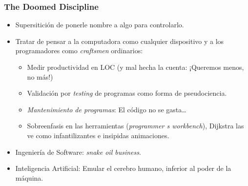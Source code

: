 \documentclass[ignorenonframetext,]{beamer}
\begin{document}
\begin{frame}\frametitle{The Doomed Discipline}

\begin{itemize}[<+->]
\itemsep1pt\parskip0pt
\item
  Supersitición de ponerle nombre a algo para controlarlo.
\item
  Tratar de pensar a la computadora como cualquier dispositivo y a los
  programadores como \emph{craftsmen} ordinarios:

  \begin{itemize}[<+->]
  \itemsep1pt\parskip0pt
  \item
    Medir productividad en LOC (y mal hecha la cuenta: ¡Queremos menos,
    no más!)
  \item
    Validación por \emph{testing} de programas como forma de
    pseudociencia.
  \item
    \emph{Mantenimiento de programas}: El código no se gasta\ldots{}
  \item
    Sobreenfasis en las herramientas (\emph{programmer s workbench}),
    Dijkstra las ve como infantilizantes e insipidas animaciones.
  \end{itemize}
\item
  Ingeniería de Software: \emph{snake oil business}.
\item
  Inteligencia Artificial: Emular el cerebro humano, inferior al poder
  de la máquina.
\end{itemize}

\end{frame}
\end{document}
